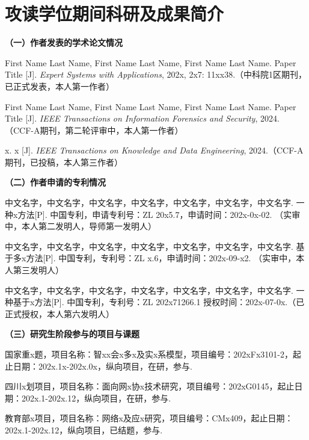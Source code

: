 
\chapter{攻读学位期间科研及成果简介}  %

\noindent\textbf{（一）作者发表的学术论文情况}
\vspace{0.25em}

\noindent[1] First Name Last Name, First Name Last Name, First Name Last Name. Paper Title [J]. \textit{Expert Systems with Applications}, 202x, 2x7: 11xx38.（中科院1区期刊，已正式发表，本人第一作者）

\noindent[2] First Name Last Name, First Name Last Name, First Name Last Name. Paper Title [J]. \textit{IEEE Transactions on Information Forensics and Security}, 2024.（CCF-A期刊，第二轮评审中，本人第一作者）

\noindent[3]x. x [J]. \textit{IEEE Transactions on Knowledge and Data Engineering}, 2024.（CCF-A期刊，已投稿，本人第三作者）

\vspace{1em}

\noindent\textbf{（二）作者申请的专利情况}
\vspace{0.25em}

\noindent[1] 中文名字，中文名字，中文名字，中文名字，中文名字，中文名字，中文名字. 一种x方法[P]. 中国专利，申请专利号：ZL 20x5.7，申请时间：202x-0x-02. （实审中，本人第二发明人，导师第一发明人）

\noindent[2] 中文名字，中文名字，中文名字，中文名字，中文名字，中文名字，中文名字. 基于多x方法[P]. 中国专利，专利号：ZL x.6，申请时间：202x-09-x2. （实审中，本人第三发明人）

\noindent[3] 中文名字，中文名字，中文名字，中文名字，中文名字，中文名字，中文名字. 一种基于x方法[P]. 中国专利，专利号：ZL 202x71266.1 授权时间：202x-07-0x.（已正式授权，本人第六发明人）

\vspace{1em}

\noindent\textbf{（三）研究生阶段参与的项目与课题}
\vspace{0.25em}

\noindent[1] 国家重x题，项目名称：智xx会x多x及实x系模型，项目编号：202xFx3101-2，起止日期：202x.1x-202x.0x，纵向项目，在研，参与.


\noindent[2] 四川x划项目，项目名称：面向网x协x技术研究，项目编号：202xG0145，起止日期：202x.1-202x.12，纵向项目，在研，参与.


\noindent[3] 教育部x项目，项目名称：网络x及应x研究，项目编号：CMx409，起止日期：202x.1-202x.12，纵向项目，已结题，参与.





